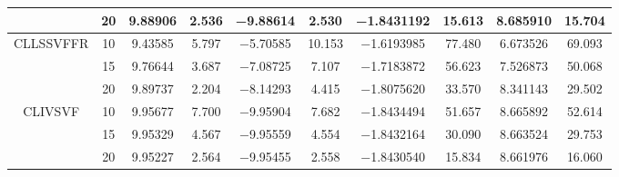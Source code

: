 \documentclass{style/presentation}
\begin{document}
\begin{frame}
\begin{table}[!htbp]
\begin{center}
\begin{tabular}{cccccccccc}
                                                             & \num{20} & \num{9.88906}                       & \num{2.536}                            & \num{-9.88614}                      & \num{2.530}                            & \num{-1.8431192} & \num{15.613}                           & \num{8.685910}                      & \num{15.704}                           \\
                \hline
                \multirow{3}{*}{CLLSSVFFR}                   & \num{10} & \num{9.43585}                       & \num{5.797}                            & \num{-5.70585}                      & \num{10.153}                           & \num{-1.6193985} & \num{77.480}                           & \num{6.673526}                      & \num{69.093}                           \\
                                                             & \num{15} & \num{9.76644}                       & \num{3.687}                            & \num{-7.08725}                      & \num{7.107}                            & \num{-1.7183872} & \num{56.623}                           & \num{7.526873}                      & \num{50.068}                           \\
                                                             & \num{20} & \num{9.89737}                       & \num{2.204}                            & \num{-8.14293}                      & \num{4.415}                            & \num{-1.8075620} & \num{33.570}                           & \num{8.341143}                      & \num{29.502}                           \\
                \hline
                \multirow{3}{*}{CLIVSVF}                     & \num{10} & \num{9.95677}                       & \num{7.700}                            & \num{-9.95904}                      & \num{7.682}                            & \num{-1.8434494} & \num{51.657}                           & \num{8.665892}                      & \num{52.614}                           \\
                                                             & \num{15} & \num{9.95329}                       & \num{4.567}                            & \num{-9.95559}                      & \num{4.554}                            & \num{-1.8432164} & \num{30.090}                           & \num{8.663524}                      & \num{29.753}                           \\
                                                             & \num{20} & \num{9.95227}                       & \num{2.564}                            & \num{-9.95455}                      & \num{2.558}                            & \num{-1.8430540} & \num{15.834}                           & \num{8.661976}                      & \num{16.060}                           \\

\end{tabular}
\end{center}
\end{table}
\end{frame}
\end{document}
